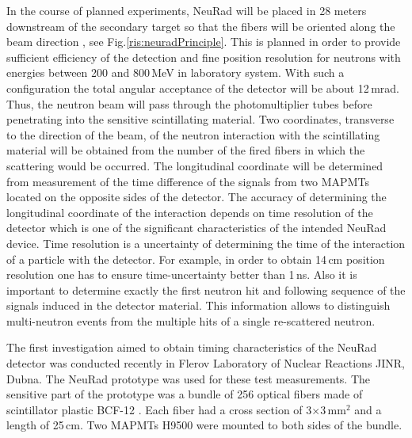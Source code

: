 \documentclass{webofc}
\begin{document}
In the course of planned experiments, NeuRad will be placed in 28 meters downstream of the secondary target so that the fibers will be oriented along the beam direction \cite{report}, see Fig.\ref{ris:neuradPrinciple}.
This is planned in order to provide sufficient efficiency of the detection and fine position resolution for neutrons with energies between 200 and 800\,MeV in laboratory system.
With such a configuration the total angular acceptance of the detector will be about 12\,mrad.
Thus, the neutron beam will pass through the photomultiplier tubes before penetrating into the sensitive scintillating material.
Two coordinates, transverse to the direction of the beam, of the neutron interaction with the scintillating material will be obtained from the number of the fired fibers in which the scattering would be occurred.
The longitudinal coordinate will be determined from measurement of the time difference of the signals from two MAPMTs located on the opposite sides of the detector. 
The accuracy of determining the longitudinal coordinate of the interaction depends on time resolution of the detector which is one of the significant characteristics of the intended NeuRad device.
Time resolution is a uncertainty of determining the time of the interaction of a particle with the detector.
For example, in order to obtain 14\,cm position resolution one has to ensure time-uncertainty better than 1\,ns.
Also it is important to determine exactly the first neutron hit and following sequence of the signals induced in the detector material. This information allows to distinguish multi-neutron events from the multiple hits of a single re-scattered neutron.


The first investigation aimed to obtain timing characteristics of the NeuRad detector was conducted recently in Flerov Laboratory of Nuclear Reactions JINR, Dubna. The NeuRad prototype was used for these test measurements. The sensitive part of the prototype was a bundle of 256 optical fibers made of scintillator plastic BCF-12 \cite{crystals}. 
Each fiber had a cross section of 3$\times$3\,mm$^2$ and a length of 25\,cm. Two MAPMTs H9500 \cite{hm} were mounted to both sides of the bundle.
\end{document}
